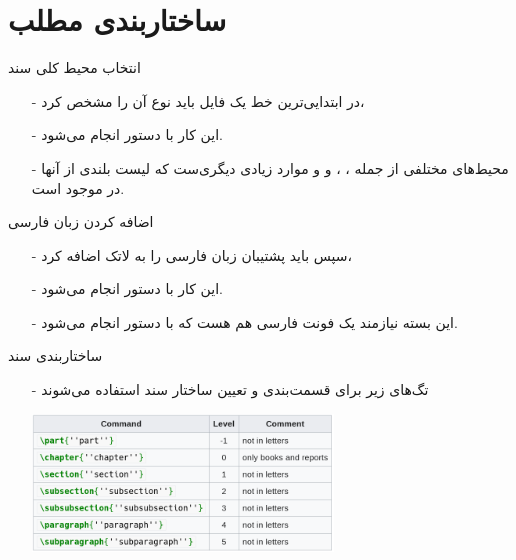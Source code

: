\section{ساختاربندی مطلب}
\begin{frame}{انتخاب محیط کلی سند}
\begin{itemize}\itemr
\item[-] 
در ابتدایی‌ترین خط یک فایل 
باید نوع آن را مشخص کرد،

\item[-]
این کار با دستور 
انجام می‌شود.

\item[-]
محیط‌های مختلفی از جمله
،
،
 و
و موارد زیادی دیگری‌ست که لیست بلندی از آنها در 
\href{https://ctan.org/topic/class}{}
موجود است.
\end{itemize}
\end{frame}

\begin{frame}{اضافه کردن زبان فارسی}
\begin{itemize}\itemr
\item[-] 
سپس باید پشتیبان زبان فارسی را به لاتک اضافه کرد،

\item[-]
این کار با دستور 
انجام می‌شود.

\item[-]
این بسته نیازمند یک فونت فارسی هم هست که با دستور 
انجام می‌شود.
\end{itemize}
\end{frame}

\begin{frame}{ساختاربندی سند}
\begin{itemize}\itemr
\item[-]
تگ‌های زیر برای قسمت‌بندی و تعیین ساختار سند استفاده می‌شوند

\begin{center}
\includegraphics[width=0.63\textwidth, height=0.53\textheight]{docs/images/sections} 
\end{center}
\end{itemize}
\end{frame}

